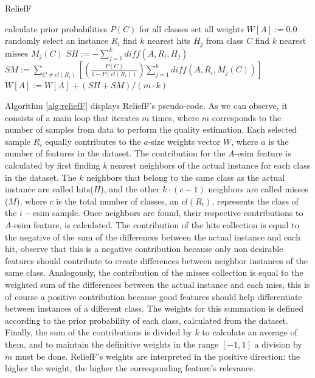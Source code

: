 \begin{algorithm}
\caption{ReliefF~\cite{Robnik2003,Kononenko1994}}
\label{alg:reliefF}
\begin{algorithmic}[1]
\STATE calculate prior probabilities $P(C)$ for all classes
\STATE set all weights $W[A] := 0.0$
  \STATE randomly select an instance $R_i$
  \STATE find $k$ nearest hits $H_j$
    \STATE from class $C$ find $k$ nearest misses $M_j(C)$
  \ENDFOR
    \STATE $SH := - \sum_{j = 1}^{k} diff(A,R_i,H_j)$ \label{alg:diff1}
    \STATE $SM := \sum_{C \neq cl(R_i)} \left [ \left ( \frac{P(C)}{1 - P(cl(R_i))} \right )\sum_{j = 1}^{k} diff(A,R_i,M_j(C))  \right ]$ \label{alg:diff2}
    \STATE $W[A] := W[A] + (SH + SM) / (m \cdot k)$
  \ENDFOR
\ENDFOR
\end{algorithmic}
\end{algorithm}

Algorithm \ref{alg:reliefF} displays ReliefF's pseudo-code. As we can observe, it consists of a main loop that iterates $m$ times, where $m$ corresponds to the number of samples from data to perform the quality estimation. Each selected sample $R_i$ equally contributes to the $a$-size weights vector $W$, where $a$ is the number of features in the dataset. The contribution for the $A$-esim feature is calculated by first finding $k$ nearest neighbors of the actual instance for each class in the dataset. The $k$ neighbors that belong to the same class as the actual instance are called hits($H$), and the other $k \cdot (c - 1)$ neighbors are called misses ($M$), where $c$ is the total number of classes, an $cl(R_i)$, represents the class of the $i-$esim sample. Once neighbors are found, their respective contributions to $A$-esim feature, is calculated. The contribution of the hits collection is equal to the negative of the sum of the differences between the actual instance and each hit, observe that this is a negative contribution because only non desirable features should contribute to create differences between neighbor instances of the same class. Analogously, the contribution of the misses collection is equal to the weighted sum of the differences between the actual instance and each miss, this is of course a positive contribution because good features should help differentiate between instances of a different class. The weights for this summation is defined according to the prior probability of each class, calculated from the dataset. Finally, the sum of the contributions is divided by $k$ to calculate an average of them, and to maintain the definitive weights in the range $[-1, 1]$ a division by $m$ must be done. ReliefF's weights are interpreted in the positive direction: the higher the weight, the higher the corresponding feature's relevance.

